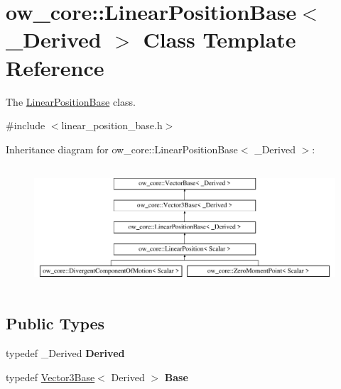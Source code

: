 \hypertarget{classow__core_1_1LinearPositionBase}{}\section{ow\+\_\+core\+:\+:Linear\+Position\+Base$<$ \+\_\+\+Derived $>$ Class Template Reference}
\label{classow__core_1_1LinearPositionBase}


The \hyperlink{classow__core_1_1LinearPositionBase}{Linear\+Position\+Base} class.  




{\ttfamily \#include $<$linear\+\_\+position\+\_\+base.\+h$>$}

Inheritance diagram for ow\+\_\+core\+:\+:Linear\+Position\+Base$<$ \+\_\+\+Derived $>$\+:\begin{figure}[H]
\begin{center}
\leavevmode
\includegraphics[height=4.575163cm]{d5/dc5/classow__core_1_1LinearPositionBase}
\end{center}
\end{figure}
\subsection*{Public Types}
\begin{DoxyCompactItemize}
\item 
typedef \+\_\+\+Derived {\bfseries Derived}\hypertarget{classow__core_1_1LinearPositionBase_affc32f142793b75a0ddfe7af8e0aeda1}{}\label{classow__core_1_1LinearPositionBase_affc32f142793b75a0ddfe7af8e0aeda1}

\item 
typedef \hyperlink{classow__core_1_1Vector3Base}{Vector3\+Base}$<$ Derived $>$ {\bfseries Base}\hypertarget{classow__core_1_1LinearPositionBase_a9e629d925584f7dc12b5104d32b330fd}{}\label{classow__core_1_1LinearPositionBase_a9e629d925584f7dc12b5104d32b330fd}

\end{DoxyCompactItemize}
